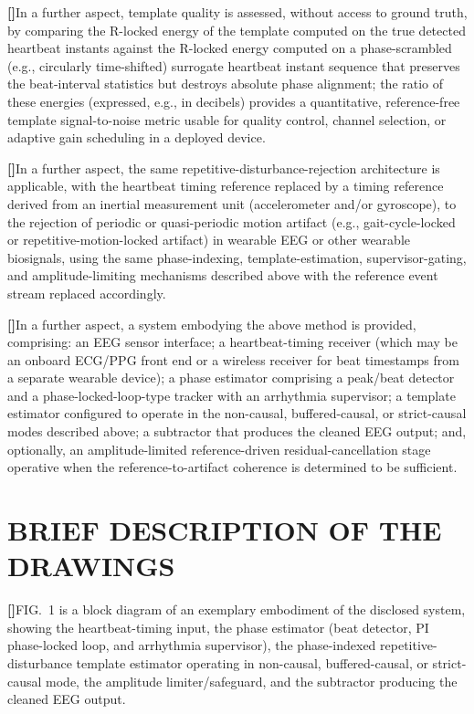 \documentclass[12pt]{article}
\newcounter{para}
\newcommand{\parnum}{\stepcounter{para}\noindent\textbf{[\thepara]}\quad}
\begin{document}
\parnum In a further aspect, template quality is assessed, without access to ground truth, by comparing the R-locked energy of the template computed on the true detected heartbeat instants against the R-locked energy computed on a phase-scrambled (e.g., circularly time-shifted) surrogate heartbeat instant sequence that preserves the beat-interval statistics but destroys absolute phase alignment; the ratio of these energies (expressed, e.g., in decibels) provides a quantitative, reference-free template signal-to-noise metric usable for quality control, channel selection, or adaptive gain scheduling in a deployed device.

\parnum In a further aspect, the same repetitive-disturbance-rejection architecture is applicable, with the heartbeat timing reference replaced by a timing reference derived from an inertial measurement unit (accelerometer and/or gyroscope), to the rejection of periodic or quasi-periodic motion artifact (e.g., gait-cycle-locked or repetitive-motion-locked artifact) in wearable EEG or other wearable biosignals, using the same phase-indexing, template-estimation, supervisor-gating, and amplitude-limiting mechanisms described above with the reference event stream replaced accordingly.

\parnum In a further aspect, a system embodying the above method is provided, comprising: an EEG sensor interface; a heartbeat-timing receiver (which may be an onboard ECG/PPG front end or a wireless receiver for beat timestamps from a separate wearable device); a phase estimator comprising a peak/beat detector and a phase-locked-loop-type tracker with an arrhythmia supervisor; a template estimator configured to operate in the non-causal, buffered-causal, or strict-causal modes described above; a subtractor that produces the cleaned EEG output; and, optionally, an amplitude-limited reference-driven residual-cancellation stage operative when the reference-to-artifact coherence is determined to be sufficient.

\section*{BRIEF DESCRIPTION OF THE DRAWINGS}

\parnum FIG.~1 is a block diagram of an exemplary embodiment of the disclosed system, showing the heartbeat-timing input, the phase estimator (beat detector, PI phase-locked loop, and arrhythmia supervisor), the phase-indexed repetitive-disturbance template estimator operating in non-causal, buffered-causal, or strict-causal mode, the amplitude limiter/safeguard, and the subtractor producing the cleaned EEG output.
\end{document}
